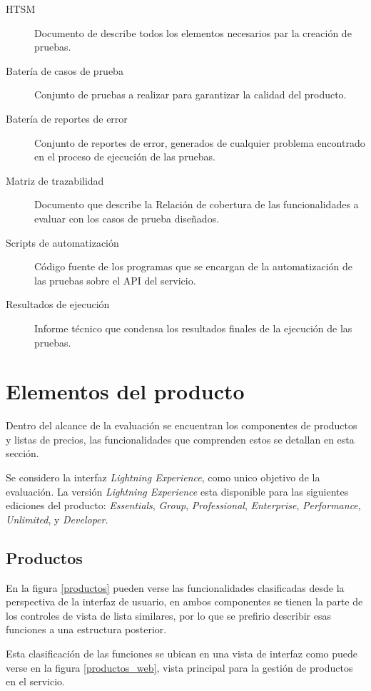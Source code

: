 \begin{description}
\item [HTSM] Documento de describe todos los elementos necesarios par la creación
    de pruebas.
\item [Batería de casos de prueba] Conjunto de pruebas a realizar para garantizar
    la calidad del producto.
\item [Batería de reportes de error] Conjunto de reportes de error, generados de
    cualquier problema encontrado en el proceso de ejecución de las pruebas.
\item [Matriz de trazabilidad] Documento que describe la Relación de cobertura
    de las funcionalidades a evaluar con los casos de prueba diseñados.
\item [Scripts de automatización] Código fuente de los programas que se encargan
    de la automatización de las pruebas sobre el API del servicio.
\item [Resultados de ejecución] Informe técnico que condensa los resultados
    finales de la ejecución de las pruebas.
\end{description}

\section{Elementos del producto}
Dentro del alcance de la evaluación se encuentran los componentes de productos
y listas de precios, las funcionalidades que comprenden estos se detallan en
esta sección.

Se considero la interfaz \emph{Lightning Experience}, como unico objetivo de la
evaluación. La versión \emph{Lightning Experience} esta disponible para las
siguientes ediciones del producto: \emph{Essentials}, \emph{Group},
\emph{Professional}, \emph{Enterprise}, \emph{Performance}, \emph{Unlimited}, y
\emph{Developer}.

\subsection{Productos}
En la figura \ref{productos} pueden verse las funcionalidades clasificadas desde
la perspectiva de la interfaz de usuario, en ambos componentes se tienen la
parte de los controles de vista de lista similares, por lo que se prefirio
describir esas funciones a una estructura posterior.

Esta clasificación de las funciones se ubican en una vista de interfaz como
puede verse en la figura \ref{productos_web}, vista principal para la gestión
de productos en el servicio.

